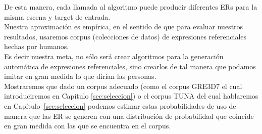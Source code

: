 De esta manera, cada llamada al algoritmo puede producir diferentes ERs para la misma escena y target de entrada. \\

Nuestra aproximaci\'on es emp\'irica, en el sentido de que para evaluar nuestros resultados, usaremos corpus (colecciones de datos) de expresiones referenciales hechas por humanos. \\

Es decir nuestra meta, no s\'olo ser\'a crear algoritmos para la generaci\'on autom\'atica de expresiones referenciales, sino crearlos de tal manera que podamos imitar en gran medida lo que dir\'ian las personas.\\

Mostraremos que dado un corpus adecuado (como el corpus GRE3D7 el cual introduciremos en Cap\'itulo \ref{sec:seleccion}) o el corpus TUNA del cual hablaremos en Cap\'itulo~\ref{sec:seleccion} podemos estimar estas probabilidades de uso de manera que las ER se generen con una distribuci\'on de probabilidad que coincide en gran medida con las que se encuentra en el corpus.\\



